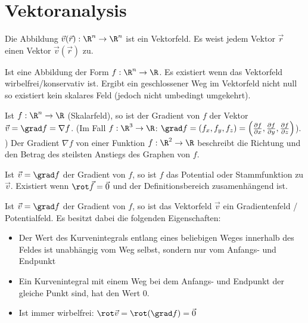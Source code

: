 \section{Vektoranalysis}
\begin{definition}[Vektorfeld]
Die Abbildung $\vec{v}(\vec{r}): \R^n \to \R^n$ ist ein Vektorfeld. Es weist jedem
Vektor $\vec{r}$ einen Vektor $\vec{v}(\vec{r})$ zu.
\end{definition}

\begin{definition}[Skalarfeld]
Ist eine Abbildung der Form $f: \R^n \to \R$. Es existiert wenn das Vektorfeld wirbelfrei/konservativ ist. Ergibt ein geschlossener Weg im Vektorfeld nicht null so existiert kein skalares Feld (jedoch nicht umbedingt umgekehrt).
\end{definition}

\begin{definition}[Gradient]
Ist $f: \R^n \to \R$ (Skalarfeld), so ist der Gradient von $f$ der Vektor
$\vec{v} = \grad f = \nabla f$. (Im Fall $f: \R^3 \to \R$:   $\grad f = (f_x, f_y, f_z) =
\left( \frac{\partial f}{\partial x}, \frac{\partial f}{\partial y}, \frac{\partial f}{\partial z} \right)$). ) 
Der Gradient $\nabla f$ von einer Funktion $f : \R^2 \to \R$ beschreibt die Richtung 
und den Betrag des steilsten Anstiegs des Graphen von $f$.
\end{definition}

\begin{definition}[Potential]
Ist $\vec{v} = \grad f$ der Gradient von $f$, so ist $f$ das Potential oder Stammfunktion zu $\vec{v}$.
Existiert wenn $\rot \vec{f} = \vec{0}$ und der Definitionsbereich zusamenhängend ist.
\end{definition}

\begin{definition}
Ist $\vec{v} = \grad f$ der Gradient von $f$, so ist das Vektorfeld $\vec{v}$
ein Gradientenfeld / Potentialfeld. Es besitzt dabei die folgenden
Eigenschaften:
\begin{itemize}
	\item Der Wert des Kurvenintegrals entlang eines beliebigen Weges innerhalb des
	Feldes ist unabhängig vom Weg selbst, sondern nur vom Anfangs- und Endpunkt
	\item Ein Kurvenintegral mit einem Weg bei dem Anfangs- und Endpunkt der
	gleiche Punkt sind, hat den Wert 0.
	\item Ist immer wirbelfrei: $\rot \vec{v} = \rot(\grad f) = \vec{0}$
\end{itemize}
\end{definition}

